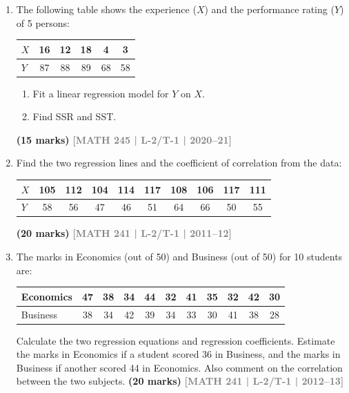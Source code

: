 \documentclass[12pt,a4paper]{article}
\newcommand{\yr}[1]{\hfill\textcolor{gray}{\small\textbf{[#1]}}}
\newcommand{\mk}[1]{\textcolor{orange!70!black}{\small\textbf{(#1 marks)}}}
\begin{document}
\label{sub:s9-regression}

\begin{enumerate}

\item The following table shows the experience ($X$) and the performance rating ($Y$) of 5 persons:
\begin{center}
\begin{tabular}{lccccc}
\toprule
$X$ & 16 & 12 & 18 & 4 & 3 \\
\midrule
$Y$ & 87 & 88 & 89 & 68 & 58 \\
\bottomrule
\end{tabular}
\end{center}
\begin{enumerate}
  \item Fit a linear regression model for $Y$ on $X$.
  \item Find SSR and SST.
\end{enumerate}
\mk{15} \yr{MATH 245 | L-2/T-1 | 2020--21}

\item Find the two regression lines and the coefficient of correlation from the data:
\begin{center}
\begin{tabular}{lccccccccc}
\toprule
$X$ & 105 & 112 & 104 & 114 & 117 & 108 & 106 & 117 & 111 \\
\midrule
$Y$ & 58  & 56  & 47  & 46  & 51  & 64  & 66  & 50  & 55  \\
\bottomrule
\end{tabular}
\end{center}
\mk{20} \yr{MATH 241 | L-2/T-1 | 2011--12}

\item The marks in Economics (out of 50) and Business (out of 50) for 10 students are:
\begin{center}
\begin{tabular}{lcccccccccc}
\toprule
Economics & 47 & 38 & 34 & 44 & 32 & 41 & 35 & 32 & 42 & 30 \\
\midrule
Business  & 38 & 34 & 42 & 39 & 34 & 33 & 30 & 41 & 38 & 28 \\
\bottomrule
\end{tabular}
\end{center}
Calculate the two regression equations and regression coefficients. Estimate the marks in Economics if a student scored 36 in Business, and the marks in Business if another scored 44 in Economics. Also comment on the correlation between the two subjects.
\mk{20} \yr{MATH 241 | L-2/T-1 | 2012--13}


\end{enumerate}
\end{document}
